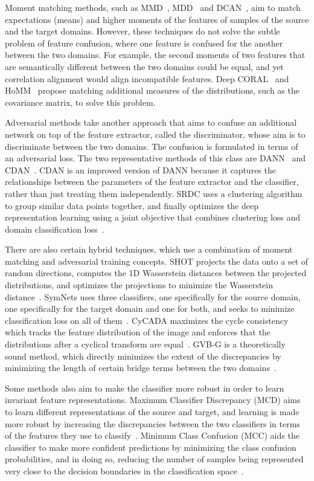 \documentclass[10pt,twocolumn,letterpaper]{article}
\begin{document}
Moment matching methods, such as MMD~\cite{mmd}, MDD~\cite{mdd} and DCAN~\cite{dcan}, aim to match expectations (means) and higher moments of the features of samples of the source and the target domains. However, these techniques do not solve the subtle problem of feature confusion, where one feature is confused for the another between the two domains. For example, the second moments of two features that are semantically different between the two domains could be equal, and yet correlation alignment would align incompatible features. Deep CORAL~\cite{deepcoral} and HoMM~\cite{homm} propose matching additional measures of the distributions, such as the covariance matrix, to solve this problem.

Adversarial methods take another approach that aims to confuse an additional network on top of the feature extractor, called the discriminator, whose aim is to discriminate between the two domains. The confusion is formulated in terms of an adversarial loss. The two representative methods of this class are DANN~\cite{dann} and CDAN~\cite{cdan}. CDAN is an improved version of DANN because it captures the relationships between the parameters of the feature extractor and the classifier, rather than just treating them independently. SRDC uses a clustering algorithm to group similar data points together, and finally optimizes the deep representation learning using a joint objective that combines clustering loss and domain classification loss~\cite{srdc}. 

There are also certain hybrid techniques, which use a combination of moment matching and adversarial training concepts. SHOT projects the data onto a set of random directions, computes the 1D Wasserstein distances between the projected distributions, and optimizes the projections to minimize the Wasserstein distance~\cite{shot}. SymNets uses three classifiers, one specifically for the source domain, one specifically for the target domain and one for both, and seeks to minimize classification loss on all of them~\cite{symnets}. CyCADA maximizes the cycle consistency which tracks the feature distribution of the image and enforces that the distributions after a cyclical transform are equal~\cite{cycada}. GVB-G is a theoretically sound method, which directly minimizes the extent of the discrepancies by minimizing the length of certain bridge terms between the two domains~\cite{gvb}.  

Some methods also aim to make the classifier more robust in order to learn invariant feature representations. Maximum Classifier Discrepancy (MCD) aims to learn different representations of the source and target, and learning is made more robust by increasing the discrepancies between the two classifiers in terms of the features they use to classify~\cite{mcd}. Minimum Class Confusion (MCC) aids the classifier to make more confident predictions by minimizing the class confusion probabilities, and in doing so, reducing the number of samples being represented very close to the decision boundaries in the classification space~\cite{mcc}. 
\end{document}
